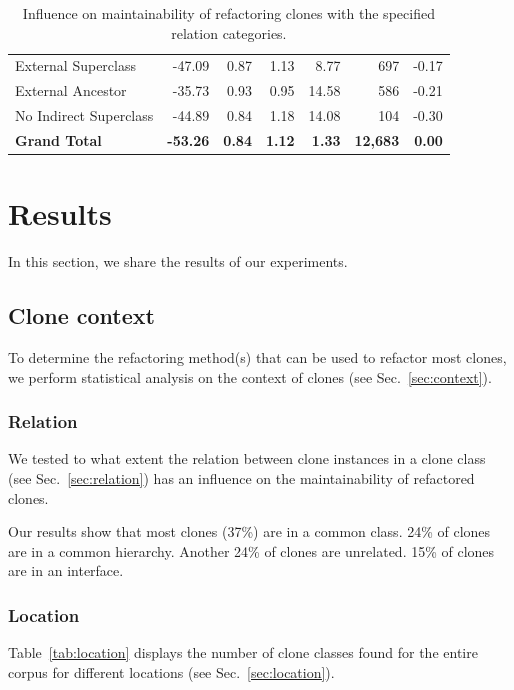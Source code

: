 \documentclass[]{IEEEtran}
\begin{document}
\begin{table}
\begin{tabular}{@{}lrrrrrr@{}}
\hspace{10pt} External Superclass & -47.09 & 0.87 & 1.13 & 8.77 & 697 & -0.17 \\
\hspace{10pt} External Ancestor & -35.73 & 0.93 & 0.95 & 14.58 & 586 & -0.21 \\
\hspace{10pt} No Indirect Superclass & -44.89 & 0.84 & 1.18 & 14.08 & 104 & -0.30 \\ \midrule
\textbf{Grand Total} & \textbf{-53.26} & \textbf{0.84} & \textbf{1.12} & \textbf{1.33} & \textbf{12,683} & \textbf{0.00} \\ \bottomrule
\end{tabular}%
\caption{Influence on maintainability of refactoring clones with the specified relation categories.}
\label{tab:relation_refactor}
\end{table}


\section{Results}
In this section, we share the results of our experiments.

\subsection{Clone context}
To determine the refactoring method(s) that can be used to refactor most clones, we perform statistical analysis on the context of clones (see Sec.~\ref{sec:context}).

\subsubsection{Relation}
We tested to what extent the relation between clone instances in a clone class (see Sec.~\ref{sec:relation}) has an influence on the maintainability of refactored clones.

Our results show that most clones (37\%) are in a common class. 24\% of clones are in a common hierarchy. Another 24\% of clones are unrelated. 15\% of clones are in an interface.

\subsubsection{Location}
Table~\ref{tab:location} displays the number of clone classes found for the entire corpus for different locations (see Sec.~\ref{sec:location}).
\end{document}
